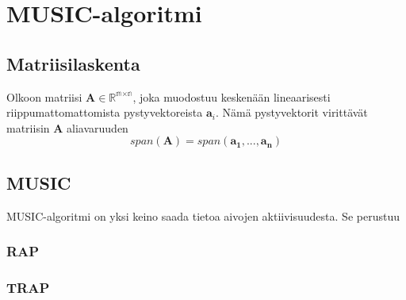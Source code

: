 \section{MUSIC-algoritmi}
\subsection{Matriisilaskenta}
Olkoon matriisi $\mathbf{A} \in \mathbb{R^{\text{m}\times\text{n}}}$, joka muodostuu keskenään lineaarisesti riippumattomattomista pystyvektoreista $\mathbf{a}_i$. Nämä pystyvektorit virittävät matriisin \textbf{A} aliavaruuden
\[span(\mathbf{A}) = span(\mathbf{a_1},...,\mathbf{a_n})\]

\subsection{MUSIC}
MUSIC-algoritmi on yksi keino saada tietoa aivojen aktiivisuudesta. Se perustuu




\subsubsection{RAP}


\subsubsection{TRAP}